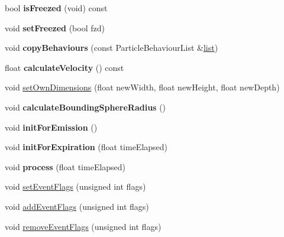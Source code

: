 \begin{DoxyCompactItemize}
\item 
\mbox{\label{structPUParticle3D_ac43d1df7e80b687621a6168936c4a9b9}} 
bool {\bfseries is\+Freezed} (void) const
\item 
\mbox{\label{structPUParticle3D_a4242b864dccf46159ce1c86c9e7b3ab7}} 
void {\bfseries set\+Freezed} (bool fzd)
\item 
\mbox{\label{structPUParticle3D_aece3edfc9aeb3b7daa4bf332b93d4119}} 
void {\bfseries copy\+Behaviours} (const Particle\+Behaviour\+List \&\hyperlink{protocollist-p}{list})
\item 
\mbox{\label{structPUParticle3D_a4bae0130f86f84e7760a678aa2ff8c81}} 
float {\bfseries calculate\+Velocity} () const
\item 
void \hyperlink{structPUParticle3D_a4420273997df8552c431f41bcb6250d6}{set\+Own\+Dimensions} (float new\+Width, float new\+Height, float new\+Depth)
\item 
\mbox{\label{structPUParticle3D_ac618288503487ae5cda102e498be0f89}} 
void {\bfseries calculate\+Bounding\+Sphere\+Radius} ()
\item 
\mbox{\label{structPUParticle3D_af9f22cfbfbb8f7c2212c711ee40c3482}} 
void {\bfseries init\+For\+Emission} ()
\item 
\mbox{\label{structPUParticle3D_ac1fb31e3f12ff40c294d750f43fc4f94}} 
void {\bfseries init\+For\+Expiration} (float time\+Elapsed)
\item 
\mbox{\label{structPUParticle3D_a8b7a53a1c9e430d534541e8378883c9c}} 
void {\bfseries process} (float time\+Elapsed)
\item 
void \hyperlink{structPUParticle3D_a5110d80e36a32b2d5161dd2a5a5e8fb7}{set\+Event\+Flags} (unsigned int flags)
\item 
void \hyperlink{structPUParticle3D_a773a59d4e9b2c7f89486b0c8168a8330}{add\+Event\+Flags} (unsigned int flags)
\item 
void \hyperlink{structPUParticle3D_a561b071d395cd92b8ea688acda6aa12a}{remove\+Event\+Flags} (unsigned int flags)
\item 

\end{DoxyCompactItemize}
